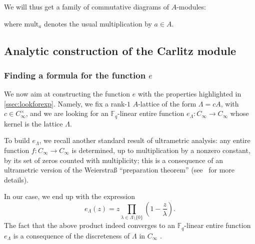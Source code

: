 \documentclass[11pt]{article}
\theoremstyle{definition}
\newcommand\Fq{\mathbb{F}_q}
\newcommand{\Cinf}{C_{\infty}}
\newcommand{\phiact}[1]{{}^\phi\! #1}
\begin{document}
We will thus get a family of commutative diagrams of $A$-modules:
\begin{center}
\end{center}
where $\text{mult}_a$ denotes the usual multiplication by $a \in A$.

\subsection{Analytic construction of the Carlitz module}\label{ssec:carlitz}



\subsubsection{Finding a formula for the function \texorpdfstring{$e$}{e}}

We now aim at constructing the function $e$ with the properties highlighted in
\cref{ssec:lookforexp}. Namely, we fix a rank-$1$ $A$-lattice of the form $\Lambda  = cA$, with $c \in \Cinf^\times$, and we are looking for an $\Fq$-linear entire function $e_\Lambda: \Cinf \to \Cinf$ whose kernel is the lattice $\Lambda$.

To build $e_\Lambda$, we recall another standard result of ultrametric analysis: any
entire function $f : \Cinf \to \Cinf$ is determined, up to multiplication by a
nonzero constant, by its set of zeros counted with multiplicity; this is a 
consequence  of an ultrametric version of the Weierstraß ``preparation theorem'' (see~\cite[\S~2.7.2]{Pap23} for more details).

In our case, we end up with the expression
\begin{equation}\label{eq-defe}
e_\Lambda(z) = 
z \prod_{\lambda \in \Lambda \setminus\{0\}} \left(1-\frac{z}{\lambda}\right).
\end{equation}
The fact that the above product indeed converges to an $\Fq$-linear entire function 
$e_\Lambda$ is a consequence of the discreteness of $\Lambda$ in $\Cinf$ 
\cite[Proposition~5.1.3]{Pap23}.
\end{document}
